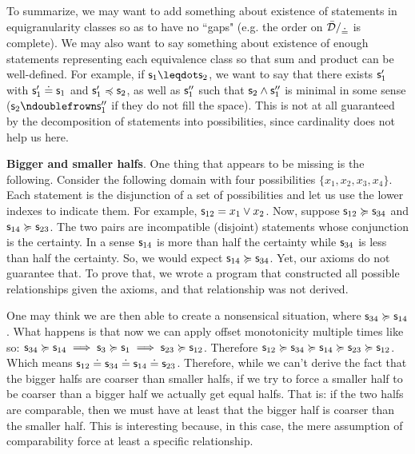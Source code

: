 \documentclass[11pt]{article}
\begin{document}
To summarize, we may want to add something about existence of statements in equigranularity classes so as to have no ``gaps" (e.g. the order on $\bar{\mathcal{D}}/_{\doteq}$ is complete). We may also want to say something about existence of enough statements representing each equivalence class so that sum and product can be well-defined. For example, if $\stmt_1\finer\stmt_2$, we want to say that there exists $\mathsf{s}_1'$ with $\mathsf{s}_1'\doteq\mathsf{s}_1$ and $\mathsf{s}_1'\preccurlyeq\mathsf{s}_2$, as well as $\mathsf{s}_1''$ such that $\mathsf{s}_2\wedge\mathsf{s}_1''$ is minimal in some sense ($\stmt_2\ncomp\stmt_1''$ if they do not fill the space). This is not at all guaranteed by the decomposition of statements into possibilities, since cardinality does not help us here.

\textbf{Bigger and smaller halfs}. One thing that appears to be missing is the following. Consider the following domain with four possibilities $\{x_1, x_2, x_3, x_4\}$. Each statement is the disjunction of a set of possibilities and let us use the lower indexes to indicate them. For example, $\mathsf{s}_{12} = x_1 \vee x_2$. Now, suppose $\mathsf{s}_{12} \succcurlyeq \mathsf{s}_{34}$ and $\mathsf{s}_{14} \succcurlyeq \mathsf{s}_{23}$. The two pairs are incompatible (disjoint) statements whose conjunction is the certainty. In a sense $\mathsf{s}_{14}$ is more than half the certainty while $\mathsf{s}_{34}$ is less than half the certainty. So, we would expect $\mathsf{s}_{14} \succcurlyeq \mathsf{s}_{34}$. Yet, our axioms do not guarantee that. To prove that, we wrote a program that constructed all possible relationships given the axioms, and that relationship was not derived.

One may think we are then able to create a nonsensical situation, where $\mathsf{s}_{34} \succcurlyeq \mathsf{s}_{14}$. What happens is that now we can apply offset monotonicity multiple times like so: $\mathsf{s}_{34} \succcurlyeq \mathsf{s}_{14} \implies \mathsf{s}_{3} \succcurlyeq \mathsf{s}_{1} \implies \mathsf{s}_{23} \succcurlyeq \mathsf{s}_{12}$. Therefore $\mathsf{s}_{12} \succcurlyeq \mathsf{s}_{34} \succcurlyeq \mathsf{s}_{14} \succcurlyeq \mathsf{s}_{23} \succcurlyeq \mathsf{s}_{12}$. Which means $\mathsf{s}_{12} \doteq \mathsf{s}_{34} \doteq \mathsf{s}_{14} \doteq \mathsf{s}_{23}$. Therefore, while we can't derive the fact that the bigger halfs are coarser than smaller halfs, if we try to force a smaller half to be coarser than a bigger half we actually get equal halfs. That is: if the two halfs are comparable, then we must have at least that the bigger half is coarser than the smaller half. This is interesting because, in this case, the mere assumption of comparability force at least a specific relationship.
\end{document}
